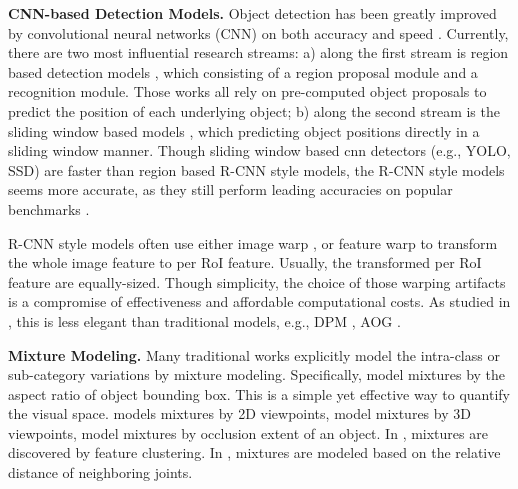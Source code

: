 \documentclass[10pt,twocolumn,letterpaper]{article}
\begin{document}
\textbf{CNN-based Detection Models.}
Object detection has been greatly improved by convolutional neural networks (CNN) on both accuracy and speed \cite{szegedy_cvpr14,szegedy_nips13,rcnn, overfeat,rcnn,fast_rcnn,faster_rcnn,rfcn,yolo,ssd}. Currently, there are two most influential research streams: a) along the first stream is region based detection models \cite{rcnn,sppnet,fast_rcnn,faster_rcnn,rfcn}, which consisting of a region proposal module and a recognition module. Those works all rely on pre-computed object proposals to predict the position of each underlying object; b) along the second stream is the sliding window based models \cite{yolo,ssd}, which predicting object positions directly in a sliding window manner. Though sliding window based cnn detectors (e.g., YOLO, SSD) are faster than region based R-CNN style models, the R-CNN style models seems more accurate, as they still perform leading accuracies on popular benchmarks \cite{pascal,imagenet,coco}.

R-CNN style models often use either image warp \cite{rcnn,yuting,yukun}, or feature warp \cite{sppnet, fast_rcnn,faster_rcnn} to transform the whole image feature to per RoI feature. Usually, the transformed per RoI feature are equally-sized. Though simplicity, the choice of those warping artifacts is a compromise of effectiveness and affordable computational costs. As studied in \cite{wanli}, this is less elegant than traditional models, e.g., DPM \cite{DPM,pff_grammar,mixture_dpm,ssdpm}, AOG \cite{zhu_grammar,carAOG}.

\textbf{Mixture Modeling.}
Many traditional works \cite{DPM,pff_grammar,mixture_dpm,ssdpm,ramananPose,subcat,3dvp,Lopez2011,bojan_cvpr13,carAOG} explicitly model the intra-class or sub-category variations by mixture modeling. 
Specifically, \cite{DPM,pff_grammar} model mixtures by the aspect ratio of object bounding box. This is a simple yet effective way to quantify the visual space. \cite{Lopez2011} models mixtures by 2D viewpoints, \cite{bojan_cvpr12,mono3d} model mixtures by 3D viewpoints, \cite{bojan_cvpr13,xiaogang1,carAOG} model mixtures by occlusion extent of an object. In \cite{mixture_dpm,subcat,3dvp}, mixtures are discovered by feature clustering. In \cite{ramananPose,xianjie}, mixtures are modeled based on the relative distance of neighboring joints.

\end{document}
